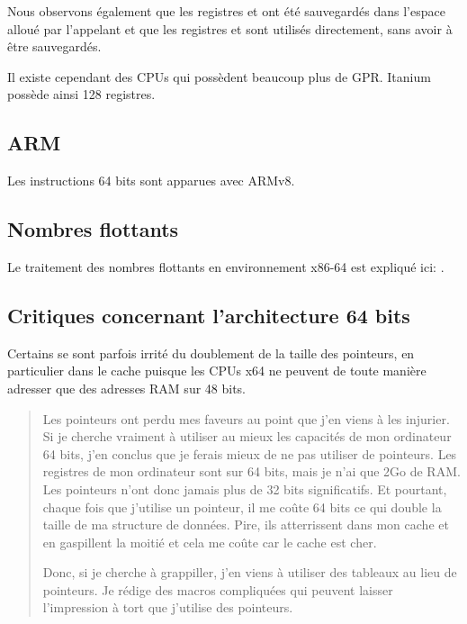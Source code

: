 Nous observons également que les registres \RCX et \RDX ont été sauvegardés dans l'espace alloué 
par l'\gls{appelant} et que les registres  et  sont utilisés directement, sans avoir 
à être sauvegardés.
\fi

Il existe cependant des CPUs qui possèdent beaucoup plus de \ac{GPR}. Itanium possède ainsi 128 
registres.

\subsection{ARM}

Les instructions 64 bits sont apparues avec ARMv8.

\subsection{Nombres flottants}

Le traitement des nombres flottants en environnement x86-64 est expliqué ici: .

\subsection{Critiques concernant l'architecture 64 bits}

Certains se sont parfois irrité du doublement de la taille des pointeurs, en particulier dans le 
cache puisque les \ac{CPU}s x64 ne peuvent de toute manière adresser que des adresses \ac{RAM} 
sur 48 bits.

\begin{framed}
\begin{quotation}
Les pointeurs ont perdu mes faveurs au point que j'en viens à les injurier. Si je cherche vraiment
à utiliser au mieux les capacités de mon ordinateur 64 bits, j'en conclus que je ferais mieux de
ne pas utiliser de pointeurs. Les registres de mon ordinateur sont sur 64 bits, mais je n'ai que
2Go de RAM. Les pointeurs n'ont donc jamais plus de 32 bits significatifs. Et pourtant, chaque
fois que j'utilise un pointeur, il me coûte 64 bits ce qui double la taille de ma structure de
données. Pire, ils atterrissent dans mon cache et en gaspillent la moitié et cela me coûte car le
cache est cher.

Donc, si je cherche à grappiller, j'en viens à utiliser des tableaux au lieu de pointeurs. Je
rédige des macros compliquées qui peuvent laisser l'impression à tort que j'utilise des pointeurs.
\end{quotation}
\end{framed}

